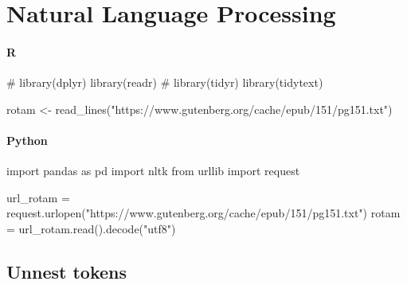 \documentclass[
  letterpaper,
  DIV=11,
  numbers=noendperiod]{scrreprt}
\newenvironment{Shaded}{\begin{snugshade}}{\end{snugshade}}
\newcommand{\CommentTok}[1]{\textcolor[rgb]{0.37,0.37,0.37}{#1}}
\newcommand{\FunctionTok}[1]{\textcolor[rgb]{0.28,0.35,0.67}{#1}}
\newcommand{\ImportTok}[1]{\textcolor[rgb]{0.00,0.46,0.62}{#1}}
\newcommand{\NormalTok}[1]{\textcolor[rgb]{0.00,0.46,0.62}{#1}}
\newcommand{\OperatorTok}[1]{\textcolor[rgb]{0.37,0.37,0.37}{#1}}
\newcommand{\OtherTok}[1]{\textcolor[rgb]{0.00,0.46,0.62}{#1}}
\newcommand{\StringTok}[1]{\textcolor[rgb]{0.13,0.47,0.30}{#1}}
\begin{document}
\hypertarget{natural-language-processing}{%
\chapter{Natural Language
Processing}\label{natural-language-processing}}

\hypertarget{r-36}{%
\subsubsection{R}\label{r-36}}

\begin{Shaded}
\begin{Highlighting}[]
\CommentTok{\# library(dplyr)}
\FunctionTok{library}\NormalTok{(readr)}
\CommentTok{\# library(tidyr)}
\FunctionTok{library}\NormalTok{(tidytext)}

\NormalTok{rotam }\OtherTok{\textless{}{-}} \FunctionTok{read\_lines}\NormalTok{(}\StringTok{"https://www.gutenberg.org/cache/epub/151/pg151.txt"}\NormalTok{)}
\end{Highlighting}
\end{Shaded}

\hypertarget{python-36}{%
\subsubsection{Python}\label{python-36}}

\begin{Shaded}
\begin{Highlighting}[]
\ImportTok{import}\NormalTok{ pandas }\ImportTok{as}\NormalTok{ pd}
\ImportTok{import}\NormalTok{ nltk}
\ImportTok{from}\NormalTok{ urllib }\ImportTok{import}\NormalTok{ request}

\NormalTok{url\_rotam }\OperatorTok{=}\NormalTok{ request.urlopen(}\StringTok{"https://www.gutenberg.org/cache/epub/151/pg151.txt"}\NormalTok{)}
\NormalTok{rotam }\OperatorTok{=}\NormalTok{ url\_rotam.read().decode(}\StringTok{"utf8"}\NormalTok{)}
\end{Highlighting}
\end{Shaded}

\hypertarget{unnest-tokens}{%
\section{Unnest tokens}\label{unnest-tokens}}
\end{document}
